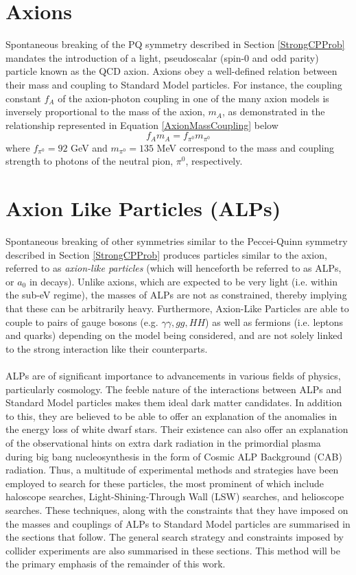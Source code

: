 \section{Axions}
Spontaneous breaking of the PQ symmetry described in Section \ref{StrongCPProb} mandates the introduction of a light, pseudoscalar (spin-0 and odd parity) particle known as the QCD axion. Axions obey a well-defined relation between their mass and coupling
to Standard Model particles. For instance, the coupling constant $f_{A}$ of the axion-photon coupling in one of the many axion models is inversely proportional to the mass of the axion, $m_{A}$, as demonstrated in the relationship represented in Equation \ref{AxionMassCoupling} below
\begin{equation}\label{AxionMassCoupling}
    f_{A}m_{A} = f_{\pi^{0}}m_{\pi^{0}}
\end{equation}
where $f_{\pi^{0}} = 92$ GeV and $m_{\pi^{0}} = 135$ MeV correspond to the mass and coupling strength to photons of the neutral pion, $\pi^{0}$, respectively.

\section{Axion Like Particles (ALPs)}
Spontaneous breaking of other symmetries similar to the Peccei-Quinn symmetry described in Section \ref{StrongCPProb} produces particles similar to the axion, referred to as \textit{axion-like particles} (which will henceforth be referred to as ALPs, or $a_{0}$ in decays). Unlike axions, which are expected to be very light (i.e. within the sub-eV regime), the masses of ALPs 
are not as constrained, thereby implying that these can be arbitrarily heavy. Furthermore, Axion-Like Particles are able to couple to pairs of
gauge bosons (e.g. $\gamma\gamma, gg, HH$) as well as fermions (i.e. leptons and quarks) depending on the model being considered, and are not solely linked to the strong interaction like their
counterparts. \\
\\
ALPs are of significant importance to advancements in various fields of physics, particularly cosmology. The feeble nature of the interactions between ALPs and Standard Model particles makes them ideal dark matter candidates. In addition to this, they
are believed to be able to offer an explanation of the anomalies in the energy loss of white dwarf stars. Their existence can also offer an explanation of the observational hints on extra dark radiation in the primordial plasma during big bang nucleosynthesis in the form
of Cosmic ALP Background (CAB) radiation. Thus, a multitude of experimental methods and strategies have been employed to search for these particles, the most prominent of which include haloscope searches, Light-Shining-Through Wall (LSW) searches, and helioscope searches. These
techniques, along with the constraints that they have imposed on the masses and couplings of ALPs to Standard Model particles are summarised in the sections that follow. The general search strategy and constraints imposed by collider experiments are also summarised in these sections. This
method will be the primary emphasis of the remainder of this work. 
